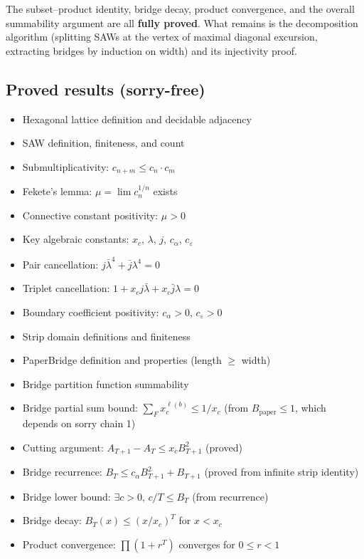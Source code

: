 \begin{lemma}
\begin{enumerate}
  The subset--product identity, bridge decay, product convergence, and
  the overall summability argument are all \textbf{fully proved}. What remains
  is the decomposition algorithm (splitting SAWs at the vertex of maximal
  diagonal excursion, extracting bridges by induction on width) and its
  injectivity proof.
\end{enumerate}

\subsection*{Proved results (sorry-free)}
\begin{itemize}
\item Hexagonal lattice definition and decidable adjacency
\item SAW definition, finiteness, and count
\item Submultiplicativity: $c_{n+m} \leq c_n \cdot c_m$
\item Fekete's lemma: $\mu = \lim c_n^{1/n}$ exists
\item Connective constant positivity: $\mu > 0$
\item Key algebraic constants: $x_c$, $\lambda$, $j$, $c_\alpha$, $c_\varepsilon$
\item Pair cancellation: $j \bar{\lambda}^4 + \bar{j} \lambda^4 = 0$
\item Triplet cancellation: $1 + x_c j \bar{\lambda} + x_c \bar{j} \lambda = 0$
\item Boundary coefficient positivity: $c_\alpha > 0$, $c_\varepsilon > 0$
\item Strip domain definitions and finiteness
\item PaperBridge definition and properties (length $\geq$ width)
\item Bridge partition function summability
\item Bridge partial sum bound: $\sum_{F} x_c^{\ell(b)} \leq 1/x_c$
  (from $B_\text{paper} \leq 1$, which depends on sorry chain 1)
\item Cutting argument: $A_{T+1} - A_T \leq x_c B_{T+1}^2$ (proved)
\item Bridge recurrence: $B_T \leq c_\alpha B_{T+1}^2 + B_{T+1}$
  (proved from infinite strip identity)
\item Bridge lower bound: $\exists c > 0,\, c/T \leq B_T$ (from recurrence)
\item Bridge decay: $B_T(x) \leq (x/x_c)^T$ for $x < x_c$
\item Product convergence: $\prod(1 + r^T)$ converges for $0 \leq r < 1$

\end{itemize}
\end{lemma}
